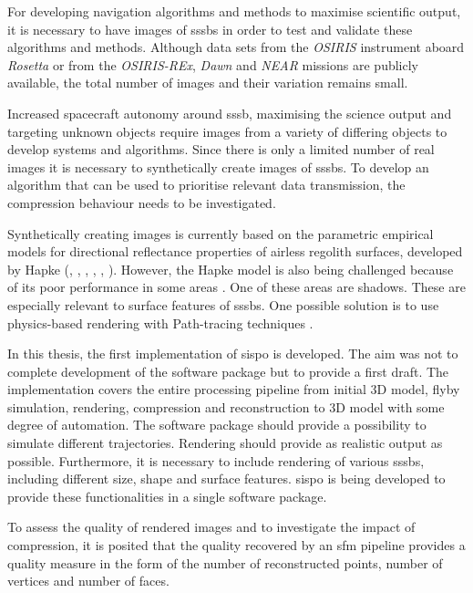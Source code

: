 For developing navigation algorithms and methods to maximise scientific output, it is necessary to have images of \gls{sssb}s in order to test and validate these algorithms and methods. Although data sets from the \textit{OSIRIS} instrument aboard \textit{Rosetta} \cite{osirisArchive} or from the \textit{OSIRIS-REx}, \textit{Dawn} and \textit{NEAR} missions \cite{palmer2014small} are publicly available, the total number of images and their variation remains small.

Increased spacecraft autonomy around \gls{sssb}, maximising the science output and targeting unknown objects require images from a variety of differing objects to develop systems and algorithms. Since there is only a limited number of real images it is necessary to synthetically create images of \gls{sssb}s. To develop an algorithm that can be used to prioritise relevant data transmission, the compression behaviour needs to be investigated. 

Synthetically creating images is currently based on the parametric empirical models for directional reflectance properties of airless regolith surfaces, developed by Hapke (\cite{hapke1981bidirectional}, \cite{hapke1984bidirectional}, \cite{hapke1986bidirectional}, \cite{hapke2002bidirectional}, \cite{hapke2008bidirectional}, \cite{hapke2012bidirectional}). However, the Hapke model is also being challenged because of its poor performance in some areas \cite{shkuratov2012critical}. One of these areas are shadows. These are especially relevant to surface features of \gls{sssb}s. One possible solution is to use physics-based rendering with Path-tracing techniques \cite{lafortune1996mathematical}.

In this thesis, the first implementation of \gls{sispo} is developed. The aim was not to complete development of the software package but to provide a first draft. The implementation covers the entire processing pipeline from initial 3D model, flyby simulation, rendering, compression and reconstruction to 3D model with some degree of automation. 
The software package should provide a possibility to simulate different trajectories. Rendering should provide as realistic output as possible. Furthermore, it is necessary to include rendering of various \gls{sssb}s, including different size, shape and surface features. \gls{sispo} is being developed to provide these functionalities in a single software package.

To assess the quality of rendered images and to investigate the impact of compression, it is posited that the quality recovered by an \gls{sfm} pipeline provides a quality measure in the form of the number of reconstructed points, number of vertices and number of faces.



